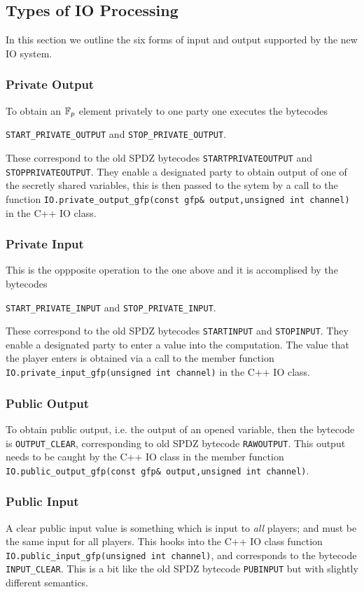 \subsection{Types of IO Processing}
In this section we outline the six forms of input and
output supported by the new IO system.

\subsubsection{Private Output}
To obtain an ${\mathbb{F}}_p$ element privately to one party one
executes the bytecodes
\begin{center}
\verb+START_PRIVATE_OUTPUT+ and \verb+STOP_PRIVATE_OUTPUT+.
\end{center}
These correspond to the old SPDZ bytecodes
\verb+STARTPRIVATEOUTPUT+ and \verb+STOPPRIVATEOUTPUT+.
They enable a designated party to obtain output of
one of the secretly shared variables, this is then passed
to the sytem by a call to the function
\verb+IO.private_output_gfp(const gfp& output,unsigned int channel)+ in the C++ IO class.

\subsubsection{Private Input}
This is the oppposite operation to the one above and it 
is accomplised by the bytecodes 
\begin{center}
\verb+START_PRIVATE_INPUT+ and \verb+STOP_PRIVATE_INPUT+.
\end{center}
These correspond to the old SPDZ bytecodes
\verb+STARTINPUT+ and \verb+STOPINPUT+.
They enable a designated party to enter a value into
the computation.
The value that the player enters is obtained via a call to the 
member function
\verb+IO.private_input_gfp(unsigned int channel)+ in the C++ IO class.

\subsubsection{Public Output}
To obtain public output, i.e. the output of an opened variable,
then the bytecode is \verb+OUTPUT_CLEAR+, corresponding to
old SPDZ bytecode \verb+RAWOUTPUT+.
This output needs to be caught by the C++ IO class in
the member function \verb+IO.public_output_gfp(const gfp& output,unsigned int channel)+.

\subsubsection{Public Input}
A clear public input value is something which is input to
{\em all} players; and must be the same input for all players.
This hooks into the C++ IO class function 
\verb+IO.public_input_gfp(unsigned int channel)+, and corresponds to the bytecode
\verb+INPUT_CLEAR+.
This is a bit like the old SPDZ bytecode \verb+PUBINPUT+
but with slightly different semantics.

